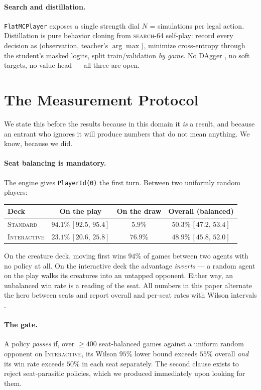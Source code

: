 \documentclass[11pt]{article}
\newcommand{\stddeck}{\textsc{Standard}}
\newcommand{\intdeck}{\textsc{Interactive}}
\newcommand{\searchn}[1]{\textsc{search}-#1}
\newcommand{\ci}[2]{\,[#1,\,#2]}
\begin{document}
\paragraph{Search and distillation.} \texttt{FlatMCPlayer} exposes a single strength dial $N$ = simulations per legal action. Distillation is pure behavior cloning from \searchn{64} self-play: record every decision as (observation, teacher's $\arg\max$), minimize cross-entropy through the student's masked logits, split train/validation \emph{by game}. No DAgger \citep{ross2011dagger}, no soft targets, no value head --- all three are open.

\section{The Measurement Protocol}
\label{sec:protocol}

We state this before the results because in this domain it \emph{is} a result, and because an entrant who ignores it will produce numbers that do not mean anything. We know, because we did.

\paragraph{Seat balancing is mandatory.} The engine gives \texttt{PlayerId(0)} the first turn. Between two uniformly random players:

\begin{center}\small
\begin{tabular}{lccc}
\toprule
Deck & On the play & On the draw & Overall (balanced) \\
\midrule
\stddeck  & $94.1\%\ci{92.5}{95.4}$ & $5.9\%$ & $50.3\%\ci{47.2}{53.4}$ \\
\intdeck  & $23.1\%\ci{20.6}{25.8}$ & $76.9\%$ & $48.9\%\ci{45.8}{52.0}$ \\
\bottomrule
\end{tabular}
\end{center}

On the creature deck, moving first wins $94\%$ of games between two agents with no policy at all. On the interactive deck the advantage \emph{inverts} --- a random agent on the play walks its creatures into an untapped opponent. Either way, an unbalanced win rate is a reading of the seat. All numbers in this paper alternate the hero between seats and report overall and per-seat rates with Wilson intervals \citep{wilson1927}.

\paragraph{The gate.} A policy \emph{passes} if, over $\ge400$ seat-balanced games against a uniform random opponent on \intdeck, its Wilson $95\%$ lower bound exceeds $55\%$ overall \emph{and} its win rate exceeds $50\%$ in each seat separately. The second clause exists to reject seat-parasitic policies, which we produced immediately upon looking for them.
\end{document}
